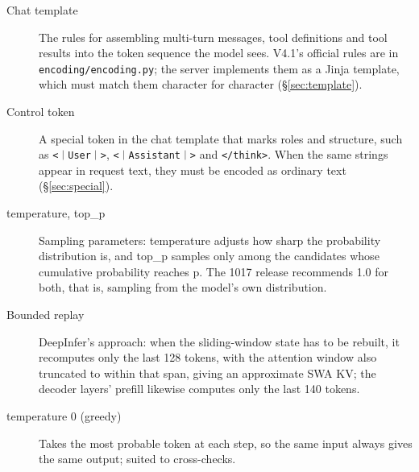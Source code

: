 \documentclass[11pt,a4paper]{article}
\newcommand{\code}[1]{\texttt{#1}}
\newcommand{\ctok}[1]{\mbox{\xeCJKsetup{CJKecglue={}}\code{#1}}}
\begin{document}
\begin{description}
  \item[Chat template] The rules for assembling multi-turn messages, tool definitions and tool results into the token sequence the model sees. V4.1's official rules are in \code{encoding/encoding.py}; the server implements them as a Jinja template, which must match them character for character (\S\ref{sec:template}).
  \item[Control token] A special token in the chat template that marks roles and structure, such as \ctok{<｜User｜>}, \ctok{<｜Assistant｜>} and \code{</think>}. When the same strings appear in request text, they must be encoded as ordinary text (\S\ref{sec:special}).
  \item[temperature, top\_p] Sampling parameters: temperature adjusts how sharp the probability distribution is, and top\_p samples only among the candidates whose cumulative probability reaches p. The 1017 release recommends 1.0 for both, that is, sampling from the model's own distribution.
  \item[Bounded replay] DeepInfer's approach: when the sliding-window state has to be rebuilt, it recomputes only the last 128 tokens, with the attention window also truncated to within that span, giving an approximate SWA KV; the decoder layers' prefill likewise computes only the last 140 tokens.
  \item[temperature 0 (greedy)] Takes the most probable token at each step, so the same input always gives the same output; suited to cross-checks.
\end{description}
\end{document}
